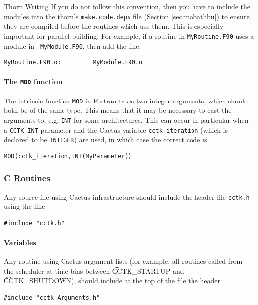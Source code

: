 \begin{cactuspart}{Thorn Writing}
If you do not follow this convention, then you have to include the
modules into the thorn's \texttt{make.code.deps} file
(Section \ref{sec:mabathbu}) to ensure they are compiled before the routines
which use them.  This is especially important for parallel building.
For example, if a routine in \texttt{MyRoutine.F90} uses a module in {\tt
MyModule.F90}, then add the line:
%
\begin{verbatim}
MyRoutine.F90.o:         MyModule.F90.o
\end{verbatim}

\paragraph{The \texttt{MOD} function}

The intrinsic function \texttt{MOD} in Fortran takes two integer
arguments, which should both be of the same type. This means
that it may be necessary to cast the arguments to, e.g.
\texttt{INT} for some architectures. This can occur in particular
when a \texttt{CCTK\_INT} parameter and the Cactus variable \texttt{cctk\_iteration}
(which is declared to be \texttt{INTEGER}) are used,
in which case the correct code is
\begin{verbatim}
MOD(cctk_iteration,INT(MyParameter))
\end{verbatim}


\subsubsection{C Routines}

Any source file using Cactus infrastructure should include
the header file \texttt{cctk.h} using the line
\begin{verbatim}
#include "cctk.h"
\end{verbatim}

\paragraph{Variables}

Any routine using Cactus argument lists (for example, all routines called from
the scheduler at time bins between {\t CCTK\_STARTUP} and {\t CCTK\_SHUTDOWN}),
should include at the top of the file the header
\begin{verbatim}
#include "cctk_Arguments.h"
\end{verbatim}


\end{cactuspart}
